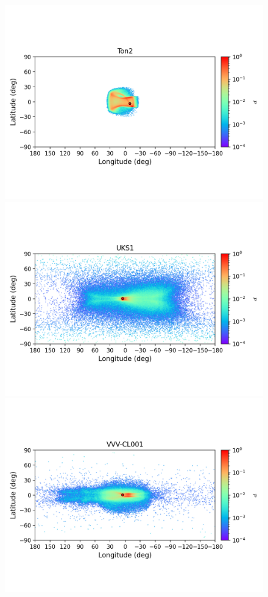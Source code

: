 \begin{figure}
        \includegraphics[clip=true, trim = 0mm 20mm 0mm 10mm, width=1\columnwidth]{images/error_plots_Ton2.png}
        \includegraphics[clip=true, trim = 0mm 20mm 0mm 10mm, width=1\columnwidth]{images/error_plots_UKS1.png}
        \includegraphics[clip=true, trim = 0mm 20mm 0mm 10mm, width=1\columnwidth]{images/error_plots_VVV-CL001.png}

\end{figure}
